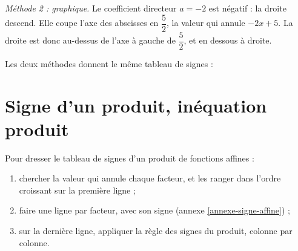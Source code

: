 \documentclass[10pt,a4paper]{article}
\begin{document}
\begin{bloc}
\begin{minipage}{0.58\linewidth}
\textit{Méthode 2 : graphique.} Le coefficient directeur \(a=-2\) est négatif : la droite descend. Elle coupe l'axe des abscisses en \(\dfrac{5}{2}\), la valeur qui annule \(-2x+5\). La droite est donc au-dessus de l'axe à gauche de \(\dfrac{5}{2}\), et en dessous à droite.
\end{minipage}\hfill
\begin{minipage}{0.38\linewidth}
\centering
{}
\end{minipage}

\smallskip
Les deux méthodes donnent le même tableau de signes :
\begin{center}
\end{center}
\end{bloc}

\section{Signe d'un produit, inéquation produit} \label{annexe-signe-produit}

\begin{bloc}
\begin{met}
Pour dresser le tableau de signes d'un produit de fonctions affines :
\begin{enumerate}
    \item chercher la valeur qui annule chaque facteur, et les ranger dans l'ordre croissant sur la première ligne ;
    \item faire une ligne par facteur, avec son signe (annexe \ref{annexe-signe-affine}) ;
    \item sur la dernière ligne, appliquer la règle des signes du produit, colonne par colonne.
\end{enumerate}
\end{met}
\end{bloc}
\end{document}
